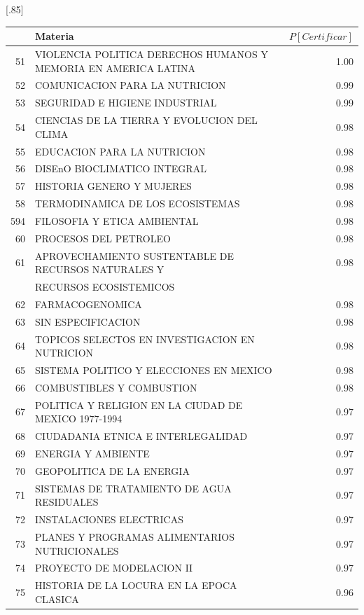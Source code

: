 \documentclass[12pt]{article}
\begin{document}
\begin{table}[ht]
\centering
\scalebox{0.75}[.85]{
\begin{tabular}{rlr}
  \hline
 & Materia & $P[Certificar]$  \\ 
  \hline 
  51 & VIOLENCIA POLITICA DERECHOS HUMANOS Y MEMORIA EN AMERICA LATINA & 1.00 \\ 
  52 & COMUNICACION PARA LA NUTRICION & 0.99 \\ 
  53 & SEGURIDAD E HIGIENE INDUSTRIAL & 0.99 \\ 
  54 & CIENCIAS DE LA TIERRA Y EVOLUCION DEL CLIMA & 0.98 \\ 
    55 & EDUCACION PARA LA NUTRICION & 0.98 \\ 
  56 & DISEnO BIOCLIMATICO INTEGRAL & 0.98 \\ 
  57 & HISTORIA GENERO Y MUJERES & 0.98 \\ 
  58 & TERMODINAMICA DE LOS ECOSISTEMAS & 0.98 \\ 
  594 & FILOSOFIA Y ETICA AMBIENTAL & 0.98 \\ 
  60 & PROCESOS DEL PETROLEO & 0.98 \\ 
  61 & APROVECHAMIENTO SUSTENTABLE DE RECURSOS NATURALES Y & 0.98 \\ 
  & RECURSOS ECOSISTEMICOS & \\ 
  62 & FARMACOGENOMICA & 0.98 \\ 
  63 & SIN ESPECIFICACION & 0.98 \\ 
  64 & TOPICOS SELECTOS EN INVESTIGACION EN NUTRICION & 0.98 \\ 
  65 & SISTEMA POLITICO Y ELECCIONES EN MEXICO & 0.98 \\ 
  66 & COMBUSTIBLES Y COMBUSTION & 0.98 \\ 
  67 & POLITICA Y RELIGION EN LA CIUDAD DE MEXICO 1977-1994 & 0.97 \\ 
  68 & CIUDADANIA ETNICA E INTERLEGALIDAD & 0.97 \\ 
  69 & ENERGIA Y AMBIENTE & 0.97 \\ 
  70 & GEOPOLITICA DE LA ENERGIA & 0.97 \\ 
  71 & SISTEMAS DE TRATAMIENTO DE AGUA RESIDUALES & 0.97 \\ 
  72 & INSTALACIONES ELECTRICAS & 0.97 \\ 
  73 & PLANES Y PROGRAMAS ALIMENTARIOS NUTRICIONALES & 0.97 \\ 
  74 & PROYECTO DE MODELACION II & 0.97 \\ 
  75 & HISTORIA DE LA LOCURA EN LA EPOCA CLASICA & 0.96 \\ 

\end{tabular}}
\end{table}
\end{document}
